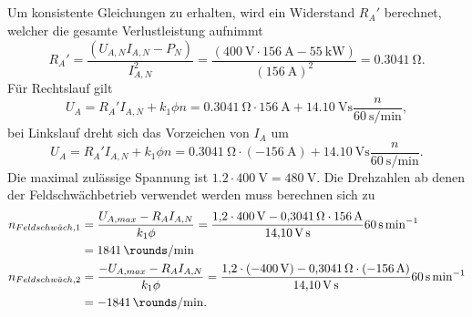 \documentclass[11pt,a4paper]{scrartcl}
\newcommand{\mybr}[1]{\left(#1\right)}
\newcommand{\0}{_{\mybr{0}}}
\newcommand{\1}{_{\mybr{1}}}
\newcommand{\2}{_{\mybr{2}}}
\begin{document}
\subsection{}
Um konsistente Gleichungen zu erhalten, wird ein Widerstand $R_A'$ berechnet, welcher die gesamte Verlustleistung aufnimmt
\begin{equation}
R_A'=\frac{\mybr{U_{A,N}I_{A,N}-P_N}}{I_{A,N}^2}=\frac{\mybr{\SI{400}{\volt}\cdot\SI{156}{\ampere}-\SI{55}{\kilo\watt}}}{\mybr{\SI{156}{\ampere}}^2}=\SI{0.3041}{\ohm}.
\end{equation}
Für Rechtslauf gilt
\begin{equation}
U_A=R_A' I_{A,N}+k_1\phi n=\SI{0.3041}{\ohm}\cdot\SI{156}{\ampere}+\SI{14.10}{\volt\second}\frac{n}{\SI{60}{\second\per\minute}},
\end{equation}
bei Linkslauf dreht sich das Vorzeichen von $I_A$ um
\begin{equation}
U_A=R_A' I_{A,N}+k_1\phi n=\SI{0.3041}{\ohm}\cdot\mybr{\SI{-156}{\ampere}}+\SI{14.10}{\volt\second}\frac{n}{\SI{60}{\second\per\minute}}.
\end{equation}
Die maximal zulässige Spannung ist $\num{1.2}\cdot\SI{400}{\volt}=\SI{480}{\volt}$.
Die Drehzahlen ab denen der Feldschwächbetrieb verwendet werden muss berechnen sich zu
\begin{align}
n_{Feldschw\ddot{a}ch,1}&=\frac{U_{A,max}-R_A I_{A,N}}{k_1\phi}=\frac{\num{1.2}\cdot\SI{400}{\volt}-\SI{0.3041}{\ohm}\cdot\SI{156}{\ampere}}{\SI{14.10}{\volt\second}}\SI{60}{\second\per\minute}\\
&=\SI{1841}{\rounds\per\minute}\\
n_{Feldschw\ddot{a}ch,2}&=\frac{-U_{A,max}-R_A I_{A,N}}{k_1\phi}=\frac{\num{1.2}\cdot\mybr{\SI{-400}{\volt}}-\SI{0.3041}{\ohm}\cdot\mybr{\SI{-156}{\ampere}}}{\SI{14.10}{\volt\second}}\SI{60}{\second\per\minute}\\
&=\SI{-1841}{\rounds\per\minute}.
\end{align}
\begin{figure*}[!h]
\centering
{}
\end{figure*}
\end{document}
